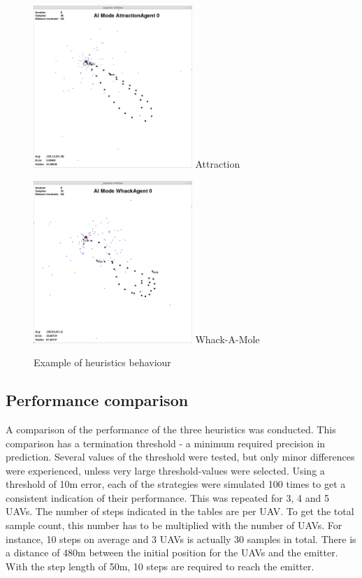 \documentclass[10pt,a4paper]{book}
\begin{document}
\begin{figure}[H]
\centering
\begin{minipage}{60mm}
  \centering
  \includegraphics[width=60mm]{./heuristicexamples/attraction.png}
  Attraction
\end{minipage}%
\begin{minipage}{60mm}
  \centering
  \includegraphics[width=60mm]{./heuristicexamples/whackamole.png}
  Whack-A-Mole
\end{minipage}
\caption{Example of heuristics behaviour}
\label{FIG_HEUR_EXAMPLE}
\end{figure}



\subsection{Performance comparison}

A comparison of the performance of the three heuristics was conducted. This comparison has a termination threshold - a minimum required precision in prediction. Several values of the threshold were tested, but only minor differences were experienced, unless very large threshold-values were selected. Using a threshold of 10m error, each of the strategies were simulated 100 times to get a consistent indication of their performance. This was repeated for 3, 4 and 5 \glspl{UAV}. The number of steps indicated in the tables are per \gls{UAV}. To get the total sample count, this number has to be multiplied with the number of \glspl{UAV}. For instance, 10 steps on average and 3 \glspl{UAV} is actually 30 samples in total. There is a distance of 480m between the initial position for the \glspl{UAV} and the emitter. With the step length of 50m, 10 steps are required to reach the emitter.
\end{document}
